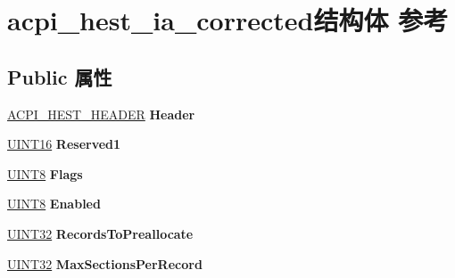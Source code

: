 \hypertarget{structacpi__hest__ia__corrected}{}\section{acpi\+\_\+hest\+\_\+ia\+\_\+corrected结构体 参考}
\label{structacpi__hest__ia__corrected}
\subsection*{Public 属性}
\begin{DoxyCompactItemize}
\item 
\mbox{\label{structacpi__hest__ia__corrected_ad71edf8c47d0fc58f10da3650cebc6e5}} 
\hyperlink{structacpi__hest__header}{A\+C\+P\+I\+\_\+\+H\+E\+S\+T\+\_\+\+H\+E\+A\+D\+ER} {\bfseries Header}
\item 
\mbox{\label{structacpi__hest__ia__corrected_ab474b90f0f356acbd4b3db27602e80a4}} 
\hyperlink{_processor_bind_8h_a09f1a1fb2293e33483cc8d44aefb1eb1}{U\+I\+N\+T16} {\bfseries Reserved1}
\item 
\mbox{\label{structacpi__hest__ia__corrected_a534949a40a298eae28c3c9ab2ad04e41}} 
\hyperlink{_processor_bind_8h_ab27e9918b538ce9d8ca692479b375b6a}{U\+I\+N\+T8} {\bfseries Flags}
\item 
\mbox{\label{structacpi__hest__ia__corrected_a6381482eb1cde365cc365756c56a1c53}} 
\hyperlink{_processor_bind_8h_ab27e9918b538ce9d8ca692479b375b6a}{U\+I\+N\+T8} {\bfseries Enabled}
\item 
\mbox{\label{structacpi__hest__ia__corrected_acdf32ab4ecfc24122f1d408acd7fc7b3}} 
\hyperlink{_processor_bind_8h_ae1e6edbbc26d6fbc71a90190d0266018}{U\+I\+N\+T32} {\bfseries Records\+To\+Preallocate}
\item 
\mbox{\label{structacpi__hest__ia__corrected_a2d904d02b63601c7d08cbb25e7e2a26c}} 
\hyperlink{_processor_bind_8h_ae1e6edbbc26d6fbc71a90190d0266018}{U\+I\+N\+T32} {\bfseries Max\+Sections\+Per\+Record}
\item 
\mbox{\label{structacpi__hest__ia__corrected_a18b687d43bce3a5e1c4c9df9d14a3dae}} 

\end{DoxyCompactItemize}
